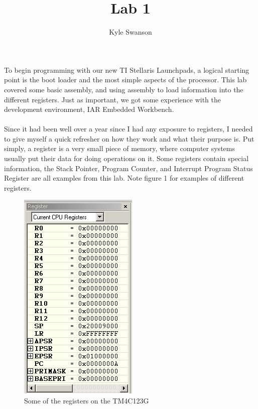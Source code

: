 \documentclass[12pt,a4paper,notitlepage]{report}
\title{Lab 1}
\author{Kyle Swanson}
\begin{document}
\maketitle

\begin{normalsize}
	\paragraph*{}
	To begin programming with our new TI Stellaris Launchpads, a logical starting point is the boot loader and the most simple aspects of the processor. This lab covered some basic assembly, and using assembly to load information into the different registers. Just as important, we got some experience with the development environment, IAR Embedded Workbench. 
	\paragraph*{}
	Since it had been well over a year since I had any exposure to registers, I needed to give myself a quick refresher on how they work and what their purpose is. Put simply, a register is a very small piece of memory, where computer systems usually put their data for doing operations on it. Some registers contain special information, the Stack Pointer, Program Counter, and Interrupt Program Status Register are all examples from this lab. Note figure 1 for examples of different registers. 
	
\begin{figure}[t!]
\begin{center}
	\includegraphics[scale=0.7]{pointers.png}
	\caption{Some of the registers on the TM4C123G}
	\end{center}
\end{figure}	
	

\end{normalsize}
\end{document}
